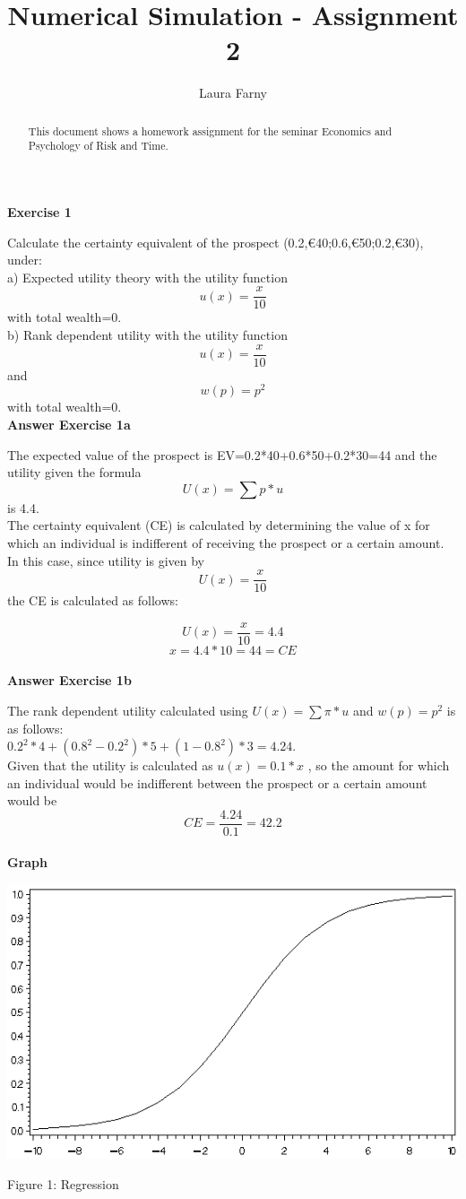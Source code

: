\documentclass[12pt]{article}
\begin{document}
	
\title{Numerical Simulation - Assignment 2}
\author{Laura Farny}

{}


\begin{abstract}
	This document shows a homework assignment for the seminar Economics and Psychology of Risk and Time.
	
\end{abstract}

\textbf {Exercise 1\\}

Calculate the certainty equivalent of the prospect (0.2,€40;0.6,€50;0.2,€30), under: \\
a) Expected utility theory with the utility function \[u(x) = \frac{x}{10}\] with total wealth=0. \\
b) Rank dependent utility with the utility function \[u(x) = \frac{x}{10}\] and \[w(p) = p^{2}\] with total wealth=0. \\



\textbf {Answer Exercise 1a\\}

The expected value of the prospect is EV=0.2*40+0.6*50+0.2*30=44 and the utility given the formula \[U(x)=\sum p*u\] is 4.4.\\
The certainty equivalent (CE) is calculated by determining the value of x for which an individual is indifferent of receiving the prospect or a certain amount. In this case, since utility is given by \[U(x)=\frac{x}{10}\]  the CE is calculated as follows:

\[U(x)= \frac{x}{10} =4.4\]
\[x=4.4*10=44=CE\]\\


\textbf {Answer Exercise 1b\\}

The rank dependent utility calculated using \(U(x)=\sum \pi *u\) and \(w(p)=p^{2}\) is as follows: \\
\(0.2^{2}*4 + (0.8^{2}-0.2^{2})*5 + (1-0.8^{2})*3 = 4.24\). \\
Given that the utility is calculated as \(u(x)=0.1*x\) , so the amount for which an individual would be indifferent between the prospect or a certain amount would be \[CE=\frac{4.24}{0.1}=42.2\]\\

\textbf {Graph\\}

\includegraphics{graph}

Figure 1: Regression
\end{document}
